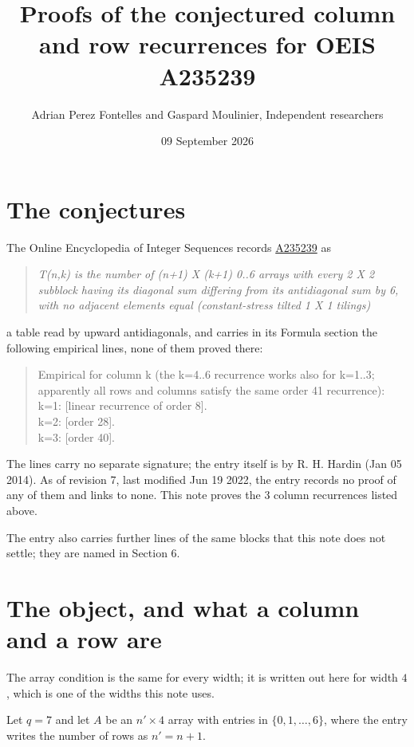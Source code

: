 \documentclass[11pt]{article}
\title{Proofs of the conjectured column and row recurrences for OEIS A235239}
\author{Adrian Perez Fontelles and Gaspard Moulinier, Independent researchers}
\date{09 September 2026}
\theoremstyle{definition}
\begin{document}
\maketitle
\section{The conjectures}

The Online Encyclopedia of Integer Sequences records \href{https://oeis.org/A235239}{A235239} as

\begin{quote}\itshape T(n,k) is the number of (n+1) X (k+1) 0..6 arrays with every 2 X 2 subblock having its diagonal sum differing from its antidiagonal sum by 6, with no adjacent elements equal (constant-stress tilted 1 X 1 tilings)\end{quote}

a table read by upward antidiagonals, and carries in its Formula section the following empirical lines, none of them proved there:

\begin{quote}\ttfamily Empirical for column k (the k=4..6 recurrence works also for k=1..3; apparently all rows and columns satisfy the same order 41 recurrence):\\
k=1: [linear recurrence of order 8].\\k=2: [order 28].\\k=3: [order 40].\end{quote}

The lines carry no separate signature; the entry itself is by R. H. Hardin (Jan 05 2014). As of revision 7, last modified Jun 19 2022, the entry records no proof of any of them and links to none. This note proves the 3 column recurrences listed above.

The entry also carries further lines of the same blocks that this note does not settle; they are named in Section 6.

\section{The object, and what a column and a row are}

The array condition is the same for every width; it is written out here for width $4$, which is one of the widths this note uses.

Let $q = 7$ and let $A$ be an $n' \times 4$ array with entries in $\{0,1,\dots,6\}$, where the entry writes the number of rows as $n' = n + 1$.
\end{document}
